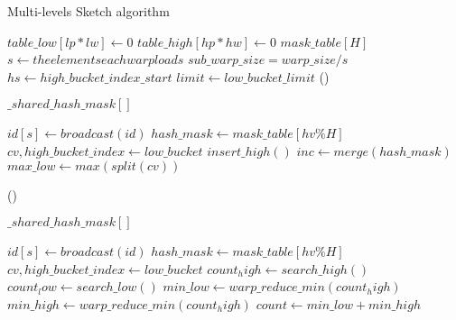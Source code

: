 \documentclass[conference]{IEEEtran}
\begin{document}
\begin{algorithm}
    \DontPrintSemicolon
    \caption{Multi-levels Sketch algorithm}
    $table\_low[lp * lw] \longleftarrow 0$\;
    $table\_high[hp * hw] \longleftarrow 0$\;
    $mask\_table[H]$\;
    $s \longleftarrow the elements each warp loads$\; %
    $sub\_warp\_size = warp\_size / s $\; %
    $hs \longleftarrow high\_bucket\_index\_start$\;
    $limit \longleftarrow low\_bucket\_limit$\;
\Fn(){}
{
    $\_shared\_ hash\_mask[]$\;
    {

        $id[s] \leftarrow broadcast(id)$\;
        $hash\_mask \leftarrow mask\_table[hv \% H]$\;
        $cv, high\_bucket\_index \leftarrow low\_bucket$\;
        {
             {
                 {
                    $insert\_high()$\;
                }
            }
        }
        {
            $inc \leftarrow merge(hash\_mask)$\;
            $max\_low \leftarrow max(split(cv))$\;
        }
    }
}

\Fn(){}
{
    $\_shared\_ hash\_mask[]$\;
    {

        $id[s] \leftarrow broadcast(id)$\;
        $hash\_mask \leftarrow mask\_table[hv \% H]$\;
        $cv, high\_bucket\_index \leftarrow low\_bucket$\;
        {
             {
                 {
                    $count_high \leftarrow search\_high()$\;
                }
            }
        }
        $count_low \leftarrow search\_low()$\;
        $min\_low \leftarrow warp\_reduce\_min(count_high)$\;
        $min\_high \leftarrow warp\_reduce\_min(count_high)$\;
        $count \leftarrow min\_low + min\_high$\;
    }
}
\end{algorithm}
\end{document}
